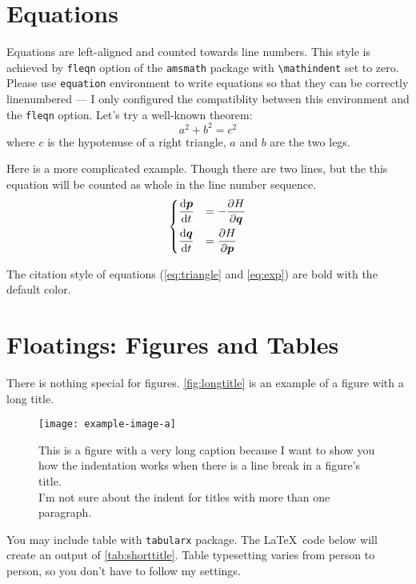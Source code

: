 \documentclass[12pt]{trbart}
\begin{document}
\section{Equations}
Equations are left-aligned and counted towards line numbers. This style is achieved by \texttt{fleqn} option of the \texttt{amsmath} package with \verb+\mathindent+ set to zero. Please use \texttt{equation} environment to write equations so that they can be correctly linenumbered --- I only configured the compatiblity between this environment and the \texttt{fleqn} option. Let's try a well-known theorem:
\begin{equation}\label{eq:triangle}
    a^2 + b^2 = c^2
\end{equation}
where \(c\) is the hypotenuse of a right triangle, \(a\) and \(b\) are the two legs.

Here is a more complicated example. Though there are two lines, but the this equation will be counted as whole in the line number sequence.
\begin{equation}\label{eq:exp}
\begin{dcases}
    \frac{\mathop{}\negthinspace\mathrm{d} \boldsymbol{p}}{\mathop{}\negthinspace\mathrm{d} t} &= -\frac{\partial H}{\partial \boldsymbol{q}} \\
    \frac{\mathop{}\negthinspace\mathrm{d} \boldsymbol{q}}{\mathop{}\negthinspace\mathrm{d} t} &= \frac{\partial H}{\partial \boldsymbol{p}}
\end{dcases} 
\end{equation}

The citation style of equations (\autoref{eq:triangle} and \autoref{eq:exp}) are bold with the default color.

\section{Floatings: Figures and Tables}
There is nothing special for figures. \autoref{fig:longtitle} is an example of a figure with a long title.
\begin{figure}[!hbt]
    \centering
    \texttt{[image: example-image-a]}
    \caption{This is a figure with a very long caption because I want to show you how the indentation works when there is a line break in a figure's title.\\ I'm not sure about the indent for titles with more than one paragraph.}\label{fig:longtitle}
\end{figure}

You may include table with \texttt{tabularx} package. The \LaTeX\ code below will create an output of \autoref{tab:shorttitle}. Table typesetting varies from person to person, so you don't have to follow my settings.
\end{document}

